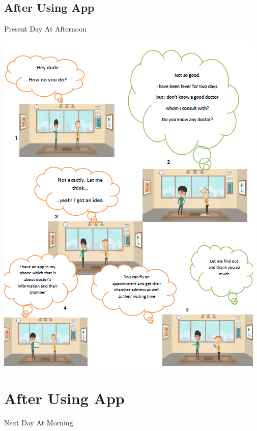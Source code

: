 \documentclass[12pt]{article}
\begin{document}
\subsection{After Using App}
Present Day At Afternoon

\includegraphics[scale = 0.99]{AFTER1.PNG}\\[1.0 cm]
\pagebreak
\section*{After Using App}
Next Day At Morning 
\end{document}
